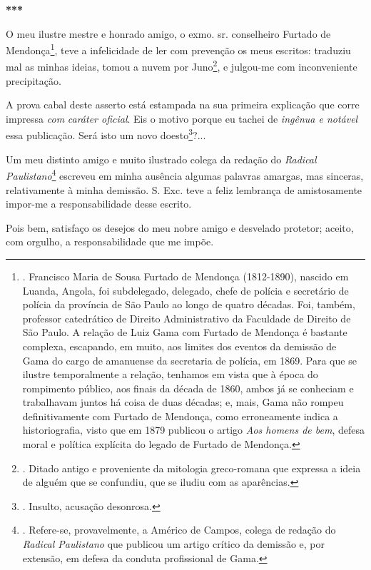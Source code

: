 \textbf{***}

O meu ilustre mestre e honrado amigo, o exmo. sr. conselheiro Furtado de
Mendonça\footnote{. Francisco Maria de Sousa Furtado de Mendonça
  (1812-1890), nascido em Luanda, Angola, foi subdelegado, delegado,
  chefe de polícia e secretário de polícia da província de São Paulo ao
  longo de quatro décadas. Foi, também, professor catedrático de Direito
  Administrativo da Faculdade de Direito de São Paulo. A relação de Luiz
  Gama com Furtado de Mendonça é bastante complexa, escapando, em muito,
  aos limites dos eventos da demissão de Gama do cargo de amanuense da
  secretaria de polícia, em 1869. Para que se ilustre temporalmente a
  relação, tenhamos em vista que à época do rompimento público, aos
  finais da década de 1860, ambos já se conheciam e trabalhavam juntos
  há coisa de duas décadas; e, mais, Gama não rompeu definitivamente com
  Furtado de Mendonça, como erroneamente indica a historiografia, visto
  que em 1879 publicou o artigo \emph{Aos homens de bem}, defesa moral e
  política explícita do legado de Furtado de Mendonça.}, teve a
infelicidade de ler com prevenção os meus escritos: traduziu mal as
minhas ideias, tomou a nuvem por Juno\footnote{. Ditado antigo e
  proveniente da mitologia greco-romana que expressa a ideia de alguém
  que se confundiu, que se iludiu com as aparências.}, e julgou-me com
inconveniente precipitação.

A prova cabal deste asserto está estampada na sua primeira explicação
que corre impressa \emph{com} \emph{caráter oficial}. Eis o motivo
porque eu tachei de \emph{ingênua e notável} essa publicação. Será isto
um novo doesto\footnote{. Insulto, acusação desonrosa.}?...

Um meu distinto amigo e muito ilustrado colega da redação do
\emph{Radical Paulistano}\footnote{. Refere-se, provavelmente, a Américo
  de Campos, colega de redação do \emph{Radical Paulistano} que publicou
  um artigo crítico da demissão e, por extensão, em defesa da conduta
  profissional de Gama.} escreveu em minha ausência algumas palavras
amargas, mas sinceras, relativamente à minha demissão. S. Exc. teve a
feliz lembrança de amistosamente impor-me a responsabilidade desse
escrito.

Pois bem, satisfaço os desejos do meu nobre amigo e desvelado protetor;
aceito, com orgulho, a responsabilidade que me impõe.

